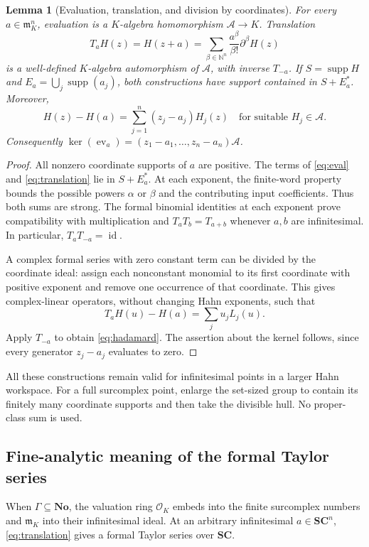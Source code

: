 \documentclass[11pt,letterpaper]{article}
\newtheorem{lemma}[lemma]{Lemma}
\theoremstyle{definition}
\theoremstyle{remark}
\newcommand{\No}{\mathbf{No}}
\newcommand{\SC}{\mathbf{SC}}
\newcommand{\N}{\mathbb N}
\newcommand{\A}{\mathscr A}
\newcommand{\OO}{\mathcal O}
\newcommand{\mm}{\mathfrak m}
\newcommand{\supp}{\operatorname{supp}}
\newcommand{\id}{\operatorname{id}}
\numberwithin{equation}{section}
\begin{document}
\begin{lemma}[Evaluation, translation, and division by coordinates]\label{lem:translation}
For every $a\in\mm_K^n$, evaluation is a $K$-algebra homomorphism $\A\to K$. Translation
\begin{equation}\label{eq:translation}
 T_aH(z)=H(z+a)
 =\sum_{\beta\in\N^n}\frac{a^\beta}{\beta!}\partial^\beta H(z)
\end{equation}
is a well-defined $K$-algebra automorphism of $\A$, with inverse $T_{-a}$. If $S=\supp H$ and $E_a=\bigcup_j\supp(a_j)$, both constructions have support contained in $S+E_a^*$. Moreover,
\begin{equation}\label{eq:hadamard}
 H(z)-H(a)=\sum_{j=1}^n(z_j-a_j)H_j(z)
 \quad\text{for suitable }H_j\in\A.
\end{equation}
Consequently $\ker(\operatorname{ev}_a)=(z_1-a_1,\ldots,z_n-a_n)\A$.
\end{lemma}
\begin{proof}
All nonzero coordinate supports of $a$ are positive. The terms of \eqref{eq:eval} and \eqref{eq:translation} lie in $S+E_a^*$. At each exponent, the finite-word property bounds the possible powers $\alpha$ or $\beta$ and the contributing input coefficients. Thus both sums are strong. The formal binomial identities at each exponent prove compatibility with multiplication and $T_aT_b=T_{a+b}$ whenever $a,b$ are infinitesimal. In particular, $T_aT_{-a}=\id$.

A complex formal series with zero constant term can be divided by the coordinate ideal: assign each nonconstant monomial to its first coordinate with positive exponent and remove one occurrence of that coordinate. This gives complex-linear operators, without changing Hahn exponents, such that
\[
 T_aH(u)-H(a)=\sum_j u_jL_j(u).
\]
Apply $T_{-a}$ to obtain \eqref{eq:hadamard}. The assertion about the kernel follows, since every generator $z_j-a_j$ evaluates to zero.
\end{proof}
All these constructions remain valid for infinitesimal points in a larger Hahn workspace. For a full surcomplex point, enlarge the set-sized group to contain its finitely many coordinate supports and then take the divisible hull. No proper-class sum is used.

\subsection{Fine-analytic meaning of the formal Taylor series}
When $\Gamma\subseteq\No$, the valuation ring $\OO_K$ embeds into the finite surcomplex numbers and $\mm_K$ into their infinitesimal ideal. At an arbitrary infinitesimal $a\in\SC^n$, \eqref{eq:translation} gives a formal Taylor series over $\SC$.
\end{document}
